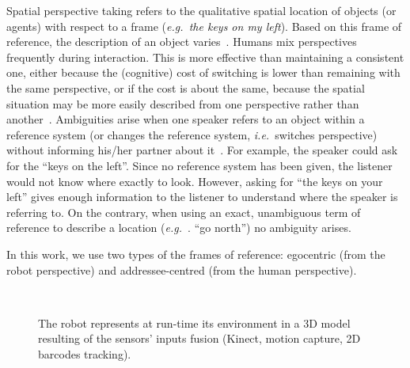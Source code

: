 \documentclass[a4paper]{article}
\newcommand{\ie}{{\textit{i.e.\ }}}
\newcommand{\eg}{{\textit{e.g.\ }}}
\begin{document}
Spatial perspective taking refers to the qualitative spatial location of
objects (or agents) with respect to a frame (\eg \emph{the keys on my left}).
Based on this frame of reference, the description of an object
varies~\cite{Marin2008}. Humans mix perspectives frequently during interaction.
This is more effective than maintaining a consistent one, either because the
(cognitive) cost of switching is lower than remaining with the same
perspective, or if the cost is about the same, because the spatial situation
may be more easily described from one perspective rather than
another~\cite{Tversky1999}. Ambiguities arise when one speaker refers to an
object within a reference system (or changes the reference system, \ie switches
perspective) without informing his/her partner about it~\cite{Breazeal2006,
Ros2010}. For example, the speaker could ask for the ``keys on the left''.
Since no reference system has been given, the listener would not know where
exactly to look.  However, asking for ``the keys on your left'' gives enough
information to the listener to understand where the speaker is referring to. On
the contrary, when using an exact, unambiguous term of reference to describe a
location (\eg. ``go north'') no ambiguity arises.

In this work, we use two types of the frames of reference: egocentric (from the
robot perspective) and addressee-centred (from the human perspective).

\begin{figure}[ht!]
   \begin{center}
%
       \\ %
%
   \end{center}

   \caption{The robot represents at run-time its environment in a 3D model
   resulting of the sensors' inputs fusion (Kinect, motion capture, 2D barcodes
   tracking).}

   \label{fig|spark}

\end{figure}
\end{document}

